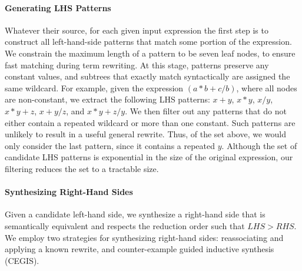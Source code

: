 \documentclass[acmsmall,review,anonymous]{acmart}\settopmatter{printfolios=true,printccs=false,printacmref=false}
\begin{document}

\paragraph{Generating LHS Patterns}
Whatever their source, for each given input expression the first step
is to construct all left-hand-side patterns that match some portion of
the expression.  We constrain the maximum length of a pattern to be
seven leaf nodes, to ensure fast matching during term rewriting. At
this stage, patterns preserve any constant values, and subtrees that
exactly match syntactically are assigned the same wildcard. For
example, given the expression $(a*b + c/b)$, where all nodes are
non-constant, we extract the following LHS patterns: $x + y$, $x * y$,
$x / y$, $x * y + z$, $x + y/z$, and $x*y + z/y$.  We then filter out
any patterns that do not either contain a repeated wildcard or more
than one constant. Such patterns are unlikely to result in a useful
general rewrite.  Thus, of the set above, we would only consider the
last pattern, since it contains a repeated $y$.  Although the set of
candidate LHS patterns is exponential in the size of the original
expression, our filtering reduces the set to a tractable size.

\paragraph{Synthesizing Right-Hand Sides} Given a candidate left-hand side, we 
synthesize a right-hand side that is semantically equivalent and
respects the reduction order such that $\mathit{LHS} > \mathit{RHS}$.
We employ two strategies for synthesizing right-hand sides:
reassociating and applying a known rewrite, and counter-example guided
inductive synthesis (CEGIS).
\end{document}
